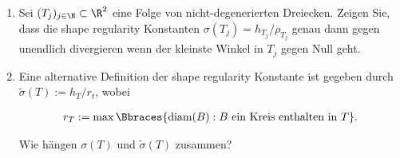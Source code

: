 
\begin{exercise}

\phantom{}

\begin{enumerate}[label = \textbf{\alph*)}]

  \item Sei $(T_j)_{j \in \N} \subset \R^2$ eine Folge von nicht-degenerierten Dreiecken.
  Zeigen Sie, dass die shape regularity Konstanten $\sigma(T_j) = h_{T_j} / \rho_{T_j}$ genau dann gegen unendlich divergieren wenn der kleinste Winkel in $T_j$ gegen Null geht.

  \item Eine alternative Definition der shape regularity Konstante ist gegeben durch $\tilde{\sigma}(T) := h_T / r_t$, wobei

  \begin{align*}
    r_T := \max
    \Bbraces
    {
      \text{diam}(B):
      B ~\text{ein Kreis enthalten in}~ T
    }.
  \end{align*}

  Wie hängen $\sigma(T)$ und $\tilde{\sigma}(T)$ zusammen?

\end{enumerate}
  
\end{exercise}
  
  
